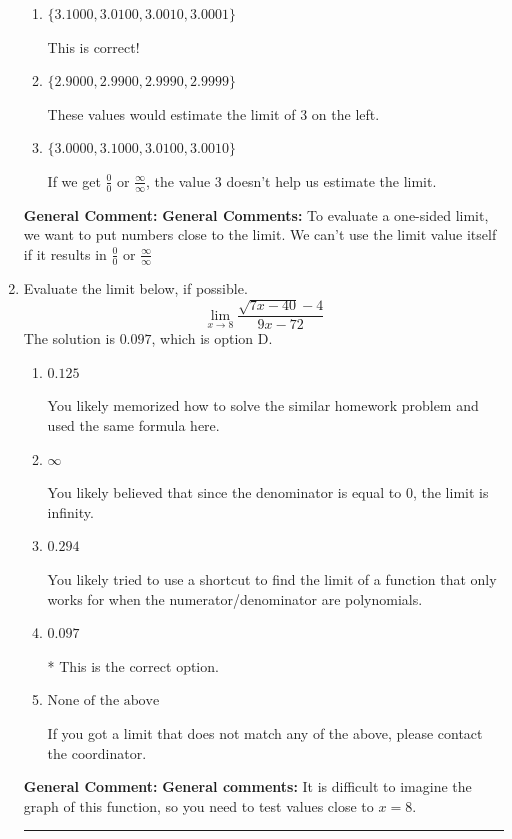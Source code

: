 \documentclass{extbook}[14pt]
\newcommand{\litem}[1]{\item #1

\rule{\textwidth}{0.4pt}}
\begin{document}
\begin{enumerate}
{\begin{enumerate}[label=\Alph*.]
If we get $\frac{0}{0}$ or $\frac{\infty}{\infty}$, the value 3 doesn't help us estimate the limit.
\item \( \{ 3.1000, 3.0100, 3.0010, 3.0001 \} \)

This is correct!
\item \( \{ 2.9000, 2.9900, 2.9990, 2.9999 \} \)

These values would estimate the limit of 3 on the left.
\item \( \{ 3.0000, 3.1000, 3.0100, 3.0010 \} \)

If we get $\frac{0}{0}$ or $\frac{\infty}{\infty}$, the value 3 doesn't help us estimate the limit.
\end{enumerate}

\textbf{General Comment:} \textbf{General Comments:} To evaluate a one-sided limit, we want to put numbers close to the limit. We can't use the limit value itself if it results in $\frac{0}{0}$ or $\frac{\infty}{\infty}$
}
\litem{
Evaluate the limit below, if possible.
\[ \lim_{x \rightarrow 8} \frac{\sqrt{7x - 40} - 4}{9x - 72} \]The solution is \( 0.097 \), which is option D.\begin{enumerate}[label=\Alph*.]
\item \( 0.125 \)

You likely memorized how to solve the similar homework problem and used the same formula here.
\item \( \infty \)

You likely believed that since the denominator is equal to 0, the limit is infinity.
\item \( 0.294 \)

You likely tried to use a shortcut to find the limit of a function that only works for when the numerator/denominator are polynomials.
\item \( 0.097 \)

* This is the correct option.
\item \( \text{None of the above} \)

If you got a limit that does not match any of the above, please contact the coordinator.
\end{enumerate}

\textbf{General Comment:} \textbf{General comments:} It is difficult to imagine the graph of this function, so you need to test values close to $x = 8$.
}
\end{enumerate}
\end{document}
